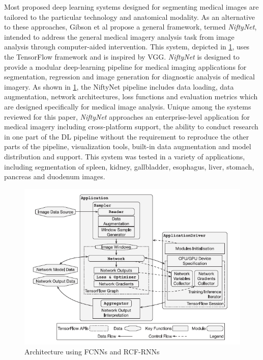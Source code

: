 \documentclass[letterpaper, 10 pt, conference]{ieeeconf}  %
\begin{document}
Most proposed deep learning systems designed for segmenting medical images are tailored to the particular technology and anatomical modality. As an alternative to these approaches, Gibson et al \cite{gibson_niftynet:_2018} propose a general framework, termed \textit{NiftyNet}, intended to address the general medical imagery analysis task from image analysis through computer-aided intervention. This system, depicted in \ref{fig:gibson1}, uses the TensorFlow framework and is inspired by VGG. \textit{NiftyNet} is designed to provide a modular deep-learning pipeline for medical imaging applications for segmentation, regression and image generation for diagnostic analysis of medical imagery. As shown in \ref{fig:gibson1}, the NiftyNet pipeline includes data loading, data augmentation, network architectures, loss functions and evaluation metrics which are designed specifically for medical image analysis. Unique among the systems reviewed for this paper, \textit{NiftyNet} approaches an enterprise-level application for medical imagery including cross-platform support, the ability to conduct research in one part of the DL pipeline without the requirement to reproduce the other parts of the pipeline, visualization tools, built-in data augmentation and model distribution and support.  This system was tested in a variety of applications, including segmentation of spleen, kidney, gallbladder, esophagus, liver, stomach, pancreas and duodenum images. 

\begin{figure}
  \includegraphics[width=\linewidth]{images/gibson.png}
  \caption{Architecture using FCNNs and RCF-RNNs \cite{gibson_niftynet:_2018}}
  \label{fig:gibson1}
\end{figure}
\end{document}
